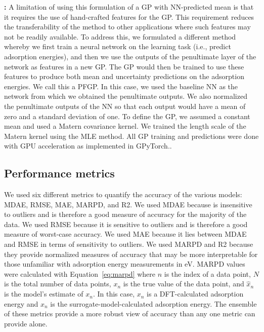\documentclass[]{achemso}
\begin{document}
\textbf{:}
A limitation of using this formulation of a \gls{GP} with \gls{NN}-predicted mean is that it requires the use of hand-crafted features for the \gls{GP}.
This requirement reduces the transferability of the method to other applications where such features may not be readily available.
To address this, we formulated a different method whereby we first train a neural network on the learning task (i.e., predict adsorption energies), and then we use the outputs of the penultimate layer of the network as features in a new \gls{GP}.
The \gls{GP} would then be trained to use these features to produce both mean and uncertainty predictions on the adsorption energies.
We call this a \gls{PFGP}.
In this case, we used the baseline \gls{NN} as the network from which we obtained the penultimate outputs.
We also normalized the penultimate outputs of the \gls{NN} so that each output would have a mean of zero and a standard deviation of one.
To define the \gls{GP}, we assumed a constant mean and used a Matern covariance kernel.
We trained the length scale of the Matern kernel using the \gls{MLE} method.
All \gls{GP} training and predictions were done with GPU acceleration as implemented in GPyTorch.\cite{Gardner2018}.


\subsection{Performance metrics}

We used six different metrics to quantify the accuracy of the various models:  \gls{MDAE}, \gls{RMSE}, \gls{MAE}, \gls{MARPD}, and \gls{R2}.
We used \gls{MDAE} because is insensitive to outliers and is therefore a good measure of accuracy for the majority of the data.
We used \gls{RMSE} because it is sensitive to outliers and is therefore a good measure of worst-case accuracy.
We used \gls{MAE} because it lies between \gls{MDAE} and \gls{RMSE} in terms of sensitivity to outliers.
We used \gls{MARPD} and \gls{R2} because they provide normalized measures of accuracy that may be more interpretable for those unfamiliar with adsorption energy measurements in \gls{eV}.
\gls{MARPD} values were calculated with Equation~\ref{eq:marpd} where $n$ is the index of a data point, $N$ is the total number of data points, $x_n$ is the true value of the data point, and $\hat{x}_n$ is the model's estimate of $x_n$.
In this case, $x_n$ is a DFT-calculated adsorption energy and $\hat{x}_n$ is the surrogate-model-calculated adsorption energy.
The ensemble of these metrics provide a more robust view of accuracy than any one metric can provide alone.
\end{document}
